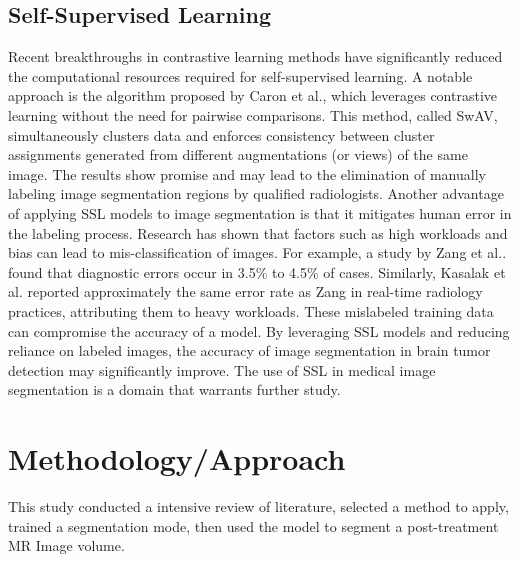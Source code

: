\documentclass[12pt, onecolumn]{IEEEtran}
\begin{document}
\subsection{Self-Supervised Learning}
Recent breakthroughs in contrastive learning methods have significantly reduced the computational resources required for self-supervised learning. A notable approach is the algorithm proposed by Caron et al.\cite{caron2021}, which leverages contrastive learning without the need for pairwise comparisons. This method, called SwAV, simultaneously clusters data and enforces consistency between cluster assignments generated from different augmentations (or views) of the same image. The results show promise and may lead to the elimination of manually labeling image segmentation regions by qualified radiologists.   Another advantage of applying SSL models to image segmentation is that it mitigates human error in the labeling process. Research has shown that factors such as high workloads and bias can lead to mis-classification of images. For example, a study by Zang et al.\cite{zang2023}. found that diagnostic errors occur in 3.5\% to 4.5\% of cases. Similarly, Kasalak et al.\cite{kasalak2023} reported approximately the same error rate as Zang in real-time radiology practices, attributing them to heavy workloads. These mislabeled training data can compromise the accuracy of a model. By leveraging SSL models and reducing reliance on labeled images, the accuracy of image segmentation in brain tumor detection may significantly improve.  The use of SSL in medical image segmentation is a domain that warrants further study. 

\section{Methodology/Approach}
This study conducted a intensive review of literature, selected a method to apply, trained a segmentation mode, then used the model to segment a post-treatment MR Image volume.
\end{document}
